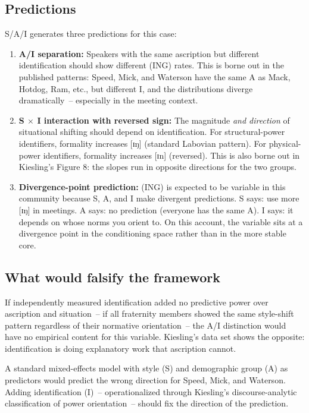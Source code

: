 \documentclass[11pt,letterpaper]{article}
\begin{document}
\subsection{Predictions}

S/A/I generates three predictions for this case:

\begin{enumerate}
    \item \textbf{A/I separation:} Speakers with the same ascription but different identification should show different (ING) rates. This is borne out in the published patterns: Speed, Mick, and Waterson have the same A as Mack, Hotdog, Ram, etc., but different I, and the distributions diverge dramatically~-- especially in the meeting context.

    \item \textbf{S $\times$ I interaction with reversed sign:} The magnitude \emph{and direction} of situational shifting should depend on identification. For structural-power identifiers, formality increases [ɪŋ] (standard Labovian pattern). For physical-power identifiers, formality increases [ɪn] (reversed). This is also borne out in Kiesling's Figure 8: the slopes run in opposite directions for the two groups.

    \item \textbf{Divergence-point prediction:} (ING) is expected to be variable in this community because S, A, and I make divergent predictions. S says: use more [ɪŋ] in meetings. A says: no prediction (everyone has the same A). I says: it depends on whose norms you orient to. On this account, the variable sits at a divergence point in the conditioning space rather than in the more stable core.
\end{enumerate}

\subsection{What would falsify the framework}

If independently measured identification added no predictive power over ascription and situation~-- if all fraternity members showed the same style-shift pattern regardless of their normative orientation~-- the A/I distinction would have no empirical content for this variable. Kiesling's data set shows the opposite: identification is doing explanatory work that ascription cannot.

A standard mixed-effects model with style (S) and demographic group (A) as predictors would predict the wrong direction for Speed, Mick, and Waterson. Adding identification (I)~-- operationalized through Kiesling's discourse-analytic classification of power orientation~-- should fix the direction of the prediction.
\end{document}
